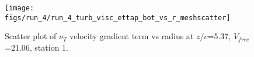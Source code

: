 \begin{figure}[H]
\centering
\texttt{[image: figs/run\_4/run\_4\_turb\_visc\_ettap\_bot\_vs\_r\_meshscatter]}
\caption{Scatter plot of $\nu_T$ velocity gradient term vs radius at $z/c$=5.37, $V_{free}$=21.06, station 1.}
\label{fig:run_4_turb_visc_ettap_bot_vs_r_meshscatter}
\end{figure}



